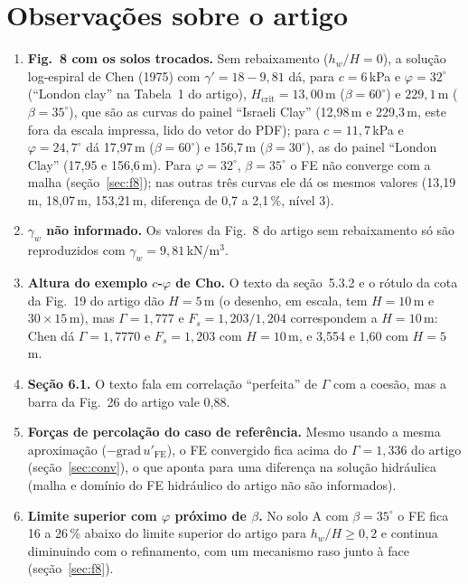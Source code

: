 \documentclass[11pt,a4paper]{article}
\newcommand{\Gam}{\Gamma}
\newcommand{\gradu}{-\mathrm{grad}\,u'_{\mathrm{FE}}}
\newcommand{\Hcrit}{H_{\mathrm{crit}}}
\begin{document}
\section{Observações sobre o artigo}\label{sec:obs}
\begin{enumerate}
\item \textbf{Fig.~8 com os solos trocados.} Sem rebaixamento ($h_w/H = 0$), a solução log-espiral de Chen (1975)
com $\gamma' = 18 - 9{,}81$ dá, para $c = 6$\,kPa e $\varphi = 32^\circ$ (``London clay'' na Tabela~1 do artigo),
$\Hcrit = 13{,}00$\,m ($\beta = 60^\circ$) e $229{,}1$\,m ($\beta = 35^\circ$), que são as curvas do painel ``Israeli
Clay'' (12,98\,m e 229,3\,m, este fora da escala impressa, lido do vetor do PDF); para $c = 11{,}7$\,kPa e
$\varphi = 24{,}7^\circ$ dá 17,97\,m ($\beta = 60^\circ$) e 156,7\,m ($\beta = 30^\circ$), as do painel ``London
Clay'' (17,95 e 156,6\,m). Para $\varphi = 32^\circ$, $\beta = 35^\circ$ o FE não converge com a malha
(seção~\ref{sec:f8}); nas outras três curvas ele dá os mesmos valores (13{,}19\,m, 18{,}07\,m, 153{,}21\,m, diferença de 0,7 a
2,1\,\%, nível 3).
\item \textbf{$\gamma_w$ não informado.} Os valores da Fig.~8 do artigo sem rebaixamento só são reproduzidos com
$\gamma_w = 9{,}81$\,kN/m$^3$.
\item \textbf{Altura do exemplo $c$-$\varphi$ de Cho.} O texto da seção~5.3.2 e o rótulo da cota da Fig.~19 do
artigo dão $H = 5$\,m (o desenho, em escala, tem $H = 10$\,m e $30 \times 15$\,m), mas $\Gam = 1{,}777$ e
$F_s = 1{,}203/1{,}204$ correspondem a $H = 10$\,m: Chen dá $\Gam = 1{,}7770$ e $F_s = 1{,}203$ com $H = 10$\,m, e
3,554 e 1,60 com $H = 5$\,m.
\item \textbf{Seção 6.1.} O texto fala em correlação ``perfeita'' de $\Gam$ com a coesão, mas a barra da Fig.~26 do
artigo vale 0,88.
\item \textbf{Forças de percolação do caso de referência.} Mesmo usando a mesma aproximação (${\gradu}$), o FE
convergido fica acima do $\Gam = 1{,}336$ do artigo (seção~\ref{sec:conv}), o que aponta para uma diferença na solução
hidráulica (malha e domínio do FE hidráulico do artigo não são informados).
\item \textbf{Limite superior com $\varphi$ próximo de $\beta$.} No solo A com $\beta = 35^\circ$ o FE fica
16 a 26\,\% abaixo do limite superior do artigo para $h_w/H \ge 0{,}2$ e continua diminuindo com o
refinamento, com um mecanismo raso junto à face (seção~\ref{sec:f8}).
\end{enumerate}
\end{document}
